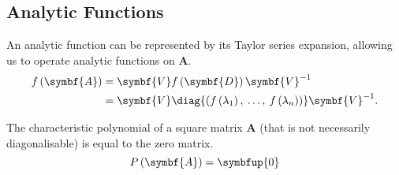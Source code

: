\documentclass{article}
\begin{document}
\subsection{Analytic Functions}
An analytic function can be represented by its Taylor series expansion, allowing us to operate analytic functions on \(\symbf{A}\).
\begin{align*}
    f\left( \symbf{A} \right) & = \symbf{V} f\left( \symbf{D} \right) \symbf{V}^{-1}                                                               \\
                              & = \symbf{V} \diag{\left( f\left( \lambda_1 \right),\: \ldots,\: f\left( \lambda_n \right) \right)} \symbf{V}^{-1}.
\end{align*}
\begin{theorem}
    The characteristic polynomial of a square matrix \(\symbf{A}\) (that is not necessarily diagonalisable)
    is equal to the zero matrix.
    \begin{equation*}
        P\left( \symbf{A} \right) = \symbfup{0}
    \end{equation*}
\end{theorem}
\end{document}

